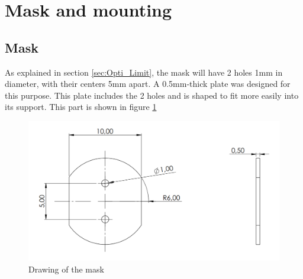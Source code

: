 \section{Mask and mounting}\label{sec:mask}
\subsection{Mask}
As explained in section \ref{sec:Opti_Limit}, the mask will have 2 holes 1mm in diameter, with their centers 5mm apart. 
A 0.5mm-thick plate was designed for this purpose. This plate includes the 2 holes and is shaped to fit more easily into its support.
This part is shown in figure \ref{fig:Mec_Mask}
\begin{figure}[H]
    \centering
    \includegraphics[scale=0.6]{assets/figures/Mechanical Design/Dessin_Mask.png}
    \caption{Drawing of the mask}
    \label{fig:Mec_Mask}
\end{figure}
